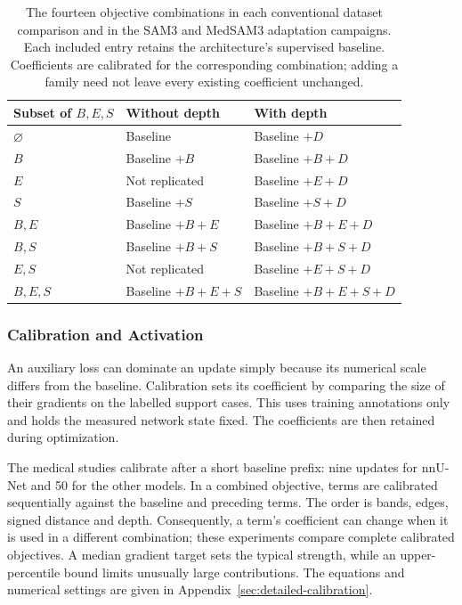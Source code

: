 \documentclass[12pt,a4paper]{article}
\begin{document}
\begin{table}[htbp]
\centering
\small
{}
\renewcommand{\arraystretch}{1.2}
\begin{tabular}{@{}P{4.6cm}P{4.6cm}P{4.6cm}@{}}
\hline
Subset of $B,E,S$ & Without depth & With depth \\
\hline
$\varnothing$ & Baseline & Baseline $+D$ \\
$B$ & Baseline $+B$ & Baseline $+B+D$ \\
$E$ & Not replicated & Baseline $+E+D$ \\
$S$ & Baseline $+S$ & Baseline $+S+D$ \\
$B,E$ & Baseline $+B+E$ & Baseline $+B+E+D$ \\
$B,S$ & Baseline $+B+S$ & Baseline $+B+S+D$ \\
$E,S$ & Not replicated & Baseline $+E+S+D$ \\
$B,E,S$ & Baseline $+B+E+S$ & Baseline $+B+E+S+D$ \\
\hline
\end{tabular}
\caption{The fourteen objective combinations in each conventional dataset
comparison and in the SAM3 and MedSAM3 adaptation campaigns.
Each included entry retains the architecture's supervised
baseline. Coefficients are calibrated for the corresponding combination;
adding a family need not leave every existing coefficient unchanged.}
\label{tab:constraint-combinations}
\end{table}

\subsubsection{Calibration and Activation}
\label{sec:calibration-methods}

An auxiliary loss can dominate an update simply because its numerical
scale differs from the baseline. Calibration sets its coefficient by
comparing the size of their gradients on the labelled support cases.
This uses training annotations only and holds the measured network state
fixed. The coefficients are then retained during optimization.

The medical studies calibrate after a short baseline prefix: nine updates
for nnU-Net and 50 for the other models. In a combined objective, terms
are calibrated sequentially against the baseline and preceding terms.
The order is bands, edges, signed distance and depth. Consequently, a
term's coefficient can change when it is used in a different combination;
these experiments compare complete calibrated objectives. A median
gradient target sets the typical strength, while an upper-percentile
bound limits unusually large contributions. The equations and numerical
settings are given in Appendix~\ref{sec:detailed-calibration}.
\end{document}
